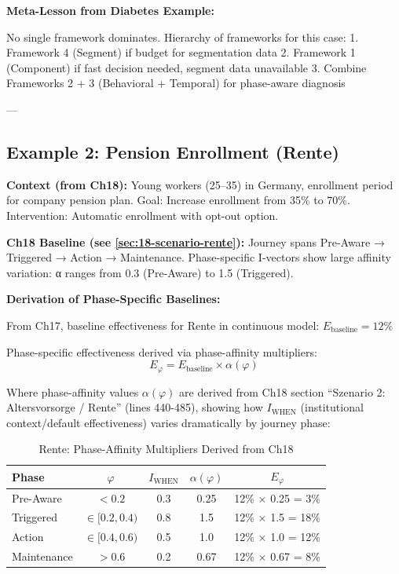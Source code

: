 \textbf{Meta-Lesson from Diabetes Example:}

No single framework dominates. Hierarchy of frameworks for this case:
1. Framework 4 (Segment) if budget for segmentation data
2. Framework 1 (Component) if fast decision needed, segment data unavailable
3. Combine Frameworks 2 + 3 (Behavioral + Temporal) for phase-aware diagnosis

---

\subsection{Example 2: Pension Enrollment (Rente)}
\label{subsec:20-ex-rente}

\textbf{Context (from Ch18):} Young workers (25--35) in Germany, enrollment period for company pension plan. Goal: Increase enrollment from 35\% to 70\%. Intervention: Automatic enrollment with opt-out option.

\textbf{Ch18 Baseline (see \ref{sec:18-scenario-rente}):} Journey spans Pre-Aware → Triggered → Action → Maintenance. Phase-specific I-vectors show large affinity variation: α ranges from 0.3 (Pre-Aware) to 1.5 (Triggered).

\textbf{Derivation of Phase-Specific Baselines:}

From Ch17, baseline effectiveness for Rente in continuous model: $E_{\text{baseline}} = 12\%$

Phase-specific effectiveness derived via phase-affinity multipliers:
\begin{equation}
E_{\varphi} = E_{\text{baseline}} \times \alpha(\varphi)
\label{eq:20-rente-phase-affinity}
\end{equation}

Where phase-affinity values $\alpha(\varphi)$ are derived from Ch18 section ``Szenario 2: Altersvorsorge / Rente'' (lines 440-485), showing how $I_{\text{WHEN}}$ (institutional context/default effectiveness) varies dramatically by journey phase:

\begin{table}[htbp]
\centering
\caption{Rente: Phase-Affinity Multipliers Derived from Ch18}
\label{tab:20-rente-phase-affinity}
\small
\renewcommand{\arraystretch}{1.2}
\begin{tabular}{@{}lcccc@{}}
\toprule
\textbf{Phase} & $\varphi$ & $I_{\text{WHEN}}$ & $\alpha(\varphi)$ & $E_{\varphi}$ \\
\midrule
Pre-Aware & $< 0.2$ & 0.3 & 0.25 & 12\% × 0.25 = 3\% \\
Triggered & $\in [0.2, 0.4)$ & 0.8 & 1.5 & 12\% × 1.5 = 18\% \\
Action & $\in [0.4, 0.6)$ & 0.5 & 1.0 & 12\% × 1.0 = 12\% \\
Maintenance & $> 0.6$ & 0.2 & 0.67 & 12\% × 0.67 = 8\% \\
\bottomrule
\end{tabular}
\end{table}

